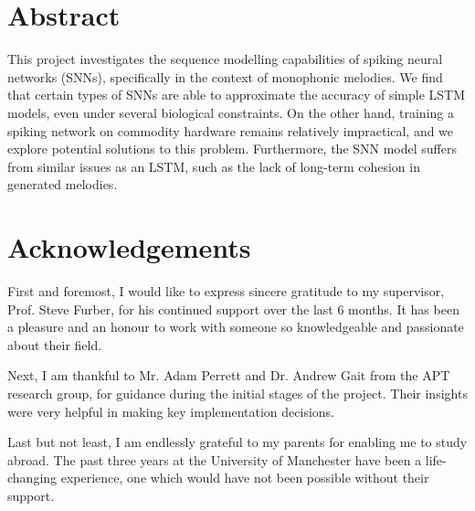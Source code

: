 \documentclass[../report.tex]{subfiles}
\begin{document}
\section*{Abstract}

This project investigates the sequence modelling capabilities of spiking neural
networks (SNNs), specifically in the context of monophonic melodies. We find
that certain types of SNNs are able to approximate the accuracy of simple LSTM
models, even under several biological constraints. On the other hand, training a
spiking network on commodity hardware remains relatively impractical, and we
explore potential solutions to this problem. Furthermore, the SNN model suffers
from similar issues as an LSTM, such as the lack of long-term cohesion in
generated melodies.

\section*{Acknowledgements}

First and foremost, I would like to express sincere gratitude to my supervisor,
Prof. Steve Furber, for his continued support over the last 6 months. It has
been a pleasure and an honour to work with someone so knowledgeable and
passionate about their field.

Next, I am thankful to Mr. Adam Perrett and Dr. Andrew Gait from the APT
research group, for guidance during the initial stages of the project. Their
insights were very helpful in making key implementation decisions.

Last but not least, I am endlessly grateful to my parents for enabling me to
study abroad. The past three years at the University of Manchester have been a
life-changing experience, one which would have not been possible without their
support.
\end{document}
